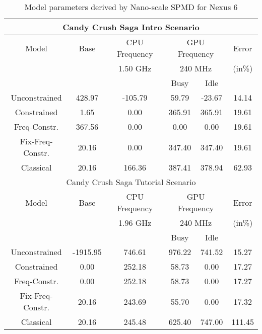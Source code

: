 \begin{table}[]
\caption{Model parameters derived by Nano-scale SPMD for Nexus 6}
\vspace{-0.1in}
{\footnotesize
\begin{tabular}{|c|c|c|c|c|c|}
    \hline
    \multicolumn{6}{|c|}{Candy Crush Saga Intro Scenario} \\
        \hline
        Model & Base & \multicolumn{1}{c|}{CPU Frequency} & \multicolumn{2}{c|}{GPU Frequency} & Error \\
        \cline{3-5}
        &  & 1.50 GHz & \multicolumn{2}{c|}{240 MHz} & (in\%) \\
        \cline{3-5}
                & & \multicolumn{1}{|c|}{} & Busy & Idle & \\
        \hline
        Unconstrained & 428.97 & -105.79 & 59.79 & -23.67 & 14.14 \\
        Constrained & 1.65 & 0.00 & 365.91 & 365.91 & 19.61 \\
        Freq-Constr. & 367.56 & 0.00 & 0.00 & 0.00 & 19.61 \\
        Fix-Freq-Constr. & 20.16 & 0.00 & 347.40 & 347.40 & 19.61 \\
        \hline
        Classical & 20.16 & 166.36 & 387.41 & 378.94 & 62.93 \\
        \hline

    \multicolumn{6}{|c|}{Candy Crush Saga Tutorial Scenario} \\
        \hline
        Model & Base & \multicolumn{1}{c|}{CPU Frequency} & \multicolumn{2}{c|}{GPU Frequency} & Error \\
        \cline{3-5}
        &  & 1.96 GHz & \multicolumn{2}{c|}{240 MHz} & (in\%) \\
        \cline{3-5}
                & & \multicolumn{1}{|c|}{} & Busy & Idle & \\
        \hline
        Unconstrained & -1915.95 & 746.61 & 976.22 & 741.52 & 15.27 \\
        Constrained & 0.00 & 252.18 & 58.73 & 0.00 & 17.27 \\
        Freq-Constr. & 0.00 & 252.18 & 58.73 & 0.00 & 17.27 \\
        Fix-Freq-Constr. & 20.16 & 243.69 & 55.70 & 0.00 & 17.32 \\
        \hline
        Classical & 20.16 & 245.48 & 625.40 & 747.00 & 111.45 \\
        \hline



\end{tabular}}
\end{table}

